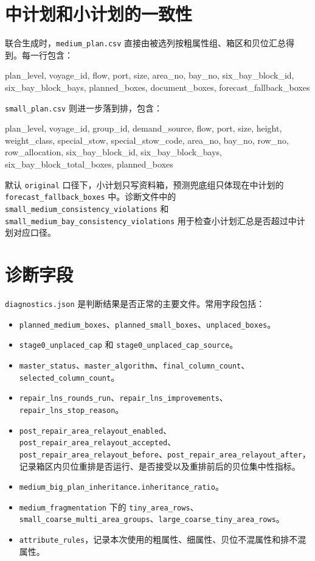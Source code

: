 \documentclass[UTF8,a4paper,11pt]{ctexart}
\newcommand{\code}[1]{\nolinkurl{#1}}
\begin{document}
\section{中计划和小计划的一致性}

联合生成时，\code{medium_plan.csv} 直接由被选列按粗属性组、箱区和贝位汇总得到。每一行包含：
\begin{flushleft}\small\ttfamily
plan\_level, voyage\_id, flow, port, size, area\_no, bay\_no, six\_bay\_block\_id, six\_bay\_block\_bays, planned\_boxes, document\_boxes, forecast\_fallback\_boxes
\end{flushleft}

\code{small_plan.csv} 则进一步落到排，包含：
\begin{flushleft}\small\ttfamily
plan\_level, voyage\_id, group\_id, demand\_source, flow, port, size, height, weight\_class, special\_stow, special\_stow\_code, area\_no, bay\_no, row\_no, row\_allocation, six\_bay\_block\_id, six\_bay\_block\_bays, six\_bay\_block\_total\_boxes, planned\_boxes
\end{flushleft}

默认 \code{original} 口径下，小计划只写资料箱，预测兜底组只体现在中计划的 \code{forecast_fallback_boxes} 中。诊断文件中的 \code{small_medium_consistency_violations} 和 \code{small_medium_bay_consistency_violations} 用于检查小计划汇总是否超过中计划对应口径。

\section{诊断字段}

\code{diagnostics.json} 是判断结果是否正常的主要文件。常用字段包括：
\begin{itemize}
  \item \code{planned_medium_boxes}、\code{planned_small_boxes}、\code{unplaced_boxes}。
  \item \code{stage0_unplaced_cap} 和 \code{stage0_unplaced_cap_source}。
  \item \code{master_status}、\code{master_algorithm}、\code{final_column_count}、\code{selected_column_count}。
  \item \code{repair_lns_rounds_run}、\code{repair_lns_improvements}、\code{repair_lns_stop_reason}。
  \item \code{post_repair_area_relayout_enabled}、\code{post_repair_area_relayout_accepted}、\code{post_repair_area_relayout_before}、\code{post_repair_area_relayout_after}，记录箱区内贝位重排是否运行、是否接受以及重排前后的贝位集中性指标。
  \item \code{medium_big_plan_inheritance.inheritance_ratio}。
  \item \code{medium_fragmentation} 下的 \code{tiny_area_rows}、\code{small_coarse_multi_area_groups}、\code{large_coarse_tiny_area_rows}。
  \item \code{attribute_rules}，记录本次使用的粗属性、细属性、贝位不混属性和排不混属性。
\end{itemize}
\end{document}
